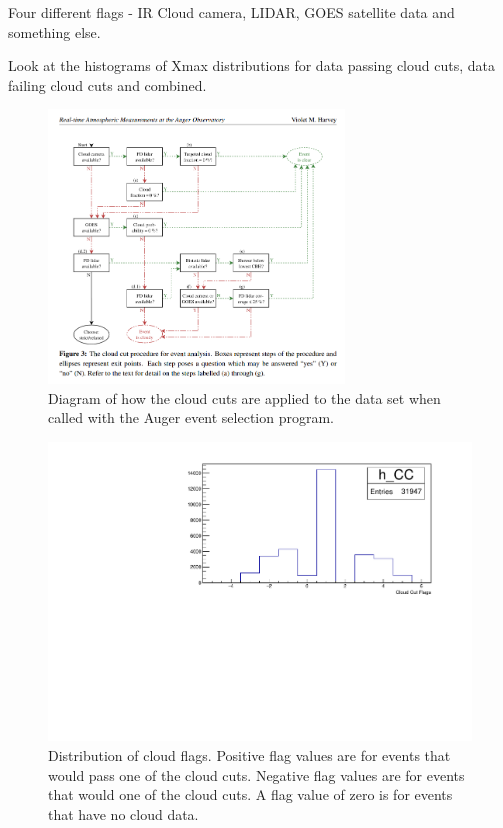 Four different flags - IR Cloud camera, LIDAR, GOES satellite data and something else.

Look at the histograms of Xmax distributions for data passing cloud cuts, data failing cloud cuts and combined.

\begin{figure}
\centering
\includegraphics[width=0.7\textwidth]{chapters/pictures/Violet_ICRC2019_CloudCut_Diagram.png}
\caption{Diagram of how the cloud cuts are applied to the data set when called with the Auger event selection program.}
\end{figure}

\begin{figure}
\centering
\includegraphics[width=\textwidth]{chapters/graphs/CloudFlags/hist_cloudFlags.pdf}
\caption{Distribution of cloud flags. Positive flag values are for events that would pass one of the cloud cuts. Negative flag values are for events that would one of the cloud cuts. A flag value of zero is for events that have no cloud data.}
\end{figure}

